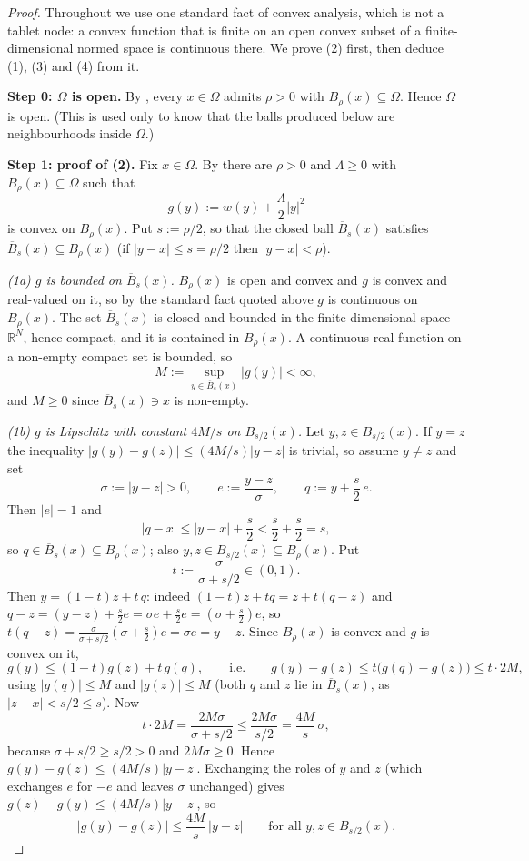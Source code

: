 \begin{proof}
Throughout we use one standard fact of convex analysis, which is not a tablet node: a convex
function that is finite on an open convex subset of a finite-dimensional normed space is
continuous there. We prove (2) first, then deduce (1), (3) and (4) from it.

\medskip\noindent\textbf{Step 0: $\Omega$ is open.} By , every
$x\in\Omega$ admits $\rho>0$ with $B_\rho(x)\subseteq\Omega$. Hence $\Omega$ is open. (This
is used only to know that the balls produced below are neighbourhoods inside $\Omega$.)

\medskip\noindent\textbf{Step 1: proof of (2).} Fix $x\in\Omega$. By
 there are $\rho>0$ and $\Lambda\ge0$ with
$B_\rho(x)\subseteq\Omega$ such that
\[
 g(y):=w(y)+\frac{\Lambda}{2}|y|^{2}
\]
is convex on $B_\rho(x)$. Put $s:=\rho/2$, so that the closed ball
$\overline B_s(x)$ satisfies $\overline B_s(x)\subseteq B_\rho(x)$ (if $|y-x|\le s=\rho/2$
then $|y-x|<\rho$).

\emph{(1a) $g$ is bounded on $\overline B_s(x)$.} $B_\rho(x)$ is open and convex and $g$ is
convex and real-valued on it, so by the standard fact quoted above $g$ is continuous on
$B_\rho(x)$. The set $\overline B_s(x)$ is closed and bounded in the finite-dimensional space
$\mathbb R^{N}$, hence compact, and it is contained in $B_\rho(x)$. A continuous real
function on a non-empty compact set is bounded, so
\[
 M:=\sup_{y\in\overline B_s(x)}|g(y)|<\infty ,
\]
and $M\ge0$ since $\overline B_s(x)\ni x$ is non-empty.

\emph{(1b) $g$ is Lipschitz with constant $4M/s$ on $B_{s/2}(x)$.} Let
$y,z\in B_{s/2}(x)$. If $y=z$ the inequality
$|g(y)-g(z)|\le (4M/s)|y-z|$ is trivial, so assume $y\ne z$ and set
\[
 \sigma:=|y-z|>0,\qquad e:=\frac{y-z}{\sigma},\qquad q:=y+\frac{s}{2}\,e .
\]
Then $|e|=1$ and
\[
 |q-x|\le|y-x|+\frac{s}{2}<\frac{s}{2}+\frac{s}{2}=s ,
\]
so $q\in\overline B_s(x)\subseteq B_\rho(x)$; also $y,z\in B_{s/2}(x)\subseteq B_\rho(x)$.
Put
\[
 t:=\frac{\sigma}{\sigma+s/2}\in(0,1).
\]
Then $y=(1-t)z+t\,q$: indeed $(1-t)z+tq=z+t(q-z)$ and
$q-z=(y-z)+\tfrac{s}{2}e=\sigma e+\tfrac{s}{2}e=(\sigma+\tfrac{s}{2})e$, so
$t(q-z)=\tfrac{\sigma}{\sigma+s/2}(\sigma+\tfrac{s}{2})e=\sigma e=y-z$. Since $B_\rho(x)$ is
convex and $g$ is convex on it,
\[
 g(y)\le(1-t)g(z)+t\,g(q),
 \qquad\text{i.e.}\qquad
 g(y)-g(z)\le t\big(g(q)-g(z)\big)\le t\cdot 2M,
\]
using $|g(q)|\le M$ and $|g(z)|\le M$ (both $q$ and $z$ lie in $\overline B_s(x)$, as
$|z-x|<s/2\le s$). Now
\[
 t\cdot 2M=\frac{2M\sigma}{\sigma+s/2}\le\frac{2M\sigma}{s/2}=\frac{4M}{s}\,\sigma ,
\]
because $\sigma+s/2\ge s/2>0$ and $2M\sigma\ge0$. Hence
$g(y)-g(z)\le(4M/s)|y-z|$. Exchanging the roles of $y$ and $z$ (which exchanges $e$ for $-e$
and leaves $\sigma$ unchanged) gives $g(z)-g(y)\le(4M/s)|y-z|$, so
\[
 |g(y)-g(z)|\le\frac{4M}{s}\,|y-z|\qquad\text{for all }y,z\in B_{s/2}(x). \tag{1}
\]


\end{proof}
